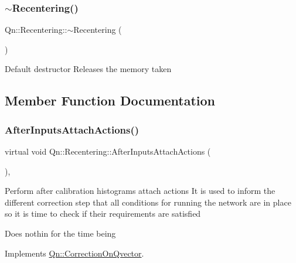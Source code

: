 \subsubsection{\texorpdfstring{$\sim$\+Recentering()}{~Recentering()}}
{\footnotesize\ttfamily Qn\+::\+Recentering\+::$\sim$\+Recentering (\begin{DoxyParamCaption}{ }\end{DoxyParamCaption})}

Default destructor Releases the memory taken 

\subsection{Member Function Documentation}
\mbox{\label{classQn_1_1Recentering_afce97632b1a2cc9ecf49a4f4768601dc}} 
\subsubsection{\texorpdfstring{After\+Inputs\+Attach\+Actions()}{AfterInputsAttachActions()}}
{\footnotesize\ttfamily virtual void Qn\+::\+Recentering\+::\+After\+Inputs\+Attach\+Actions (\begin{DoxyParamCaption}{ }\end{DoxyParamCaption})\hspace{0.3cm}{\ttfamily [inline]}, {\ttfamily [virtual]}}

Perform after calibration histograms attach actions It is used to inform the different correction step that all conditions for running the network are in place so it is time to check if their requirements are satisfied

Does nothin for the time being 

Implements \mbox{\hyperlink{classQn_1_1CorrectionOnQvector_afa95ec7804ade8097d92002e0ea05e44}{Qn\+::\+Correction\+On\+Qvector}}.

\mbox{\label{classQn_1_1Recentering_aa51bf50f4a003ac79e7d8c669b1efdac}} 
